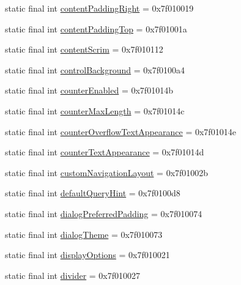\begin{CompactItemize}
static final int \hyperlink{classandroid_1_1support_1_1v7_1_1appcompat_1_1_r_1_1attr_47da2cc3b8ce02ee608e1f34dfc18f21}{contentPaddingRight} = 0x7f010019
\item 
static final int \hyperlink{classandroid_1_1support_1_1v7_1_1appcompat_1_1_r_1_1attr_7214d5fe17b36a765c3a6563280543a5}{contentPaddingTop} = 0x7f01001a
\item 
static final int \hyperlink{classandroid_1_1support_1_1v7_1_1appcompat_1_1_r_1_1attr_ebc1742ca061930cdeb0635234e0321a}{contentScrim} = 0x7f010112
\item 
static final int \hyperlink{classandroid_1_1support_1_1v7_1_1appcompat_1_1_r_1_1attr_71372fb788ababd42d0603c38f8db451}{controlBackground} = 0x7f0100a4
\item 
static final int \hyperlink{classandroid_1_1support_1_1v7_1_1appcompat_1_1_r_1_1attr_cc348e1b28754eda93136134cb55ba8f}{counterEnabled} = 0x7f01014b
\item 
static final int \hyperlink{classandroid_1_1support_1_1v7_1_1appcompat_1_1_r_1_1attr_b65c829ee7a1b2ab0e6fb5b5c5a8e718}{counterMaxLength} = 0x7f01014c
\item 
static final int \hyperlink{classandroid_1_1support_1_1v7_1_1appcompat_1_1_r_1_1attr_430bf56865694a4e5c5e57b4f3d0655f}{counterOverflowTextAppearance} = 0x7f01014e
\item 
static final int \hyperlink{classandroid_1_1support_1_1v7_1_1appcompat_1_1_r_1_1attr_42ac8746b85518b9fcdb38ef3c9d86c7}{counterTextAppearance} = 0x7f01014d
\item 
static final int \hyperlink{classandroid_1_1support_1_1v7_1_1appcompat_1_1_r_1_1attr_6b805028752180b18c6ab4b4f583c9ac}{customNavigationLayout} = 0x7f01002b
\item 
static final int \hyperlink{classandroid_1_1support_1_1v7_1_1appcompat_1_1_r_1_1attr_ef4e06325d6e9e66be66a35c247f876e}{defaultQueryHint} = 0x7f0100d8
\item 
static final int \hyperlink{classandroid_1_1support_1_1v7_1_1appcompat_1_1_r_1_1attr_52bf8ee89c096a0442fe38bec06de858}{dialogPreferredPadding} = 0x7f010074
\item 
static final int \hyperlink{classandroid_1_1support_1_1v7_1_1appcompat_1_1_r_1_1attr_eb93b36e610e68f2303442bebdebe61d}{dialogTheme} = 0x7f010073
\item 
static final int \hyperlink{classandroid_1_1support_1_1v7_1_1appcompat_1_1_r_1_1attr_8958e4be96de96d8e11be11621b0a503}{displayOptions} = 0x7f010021
\item 
static final int \hyperlink{classandroid_1_1support_1_1v7_1_1appcompat_1_1_r_1_1attr_5890e14d386c4cfc70082aea5b1f91a8}{divider} = 0x7f010027

\end{CompactItemize}
